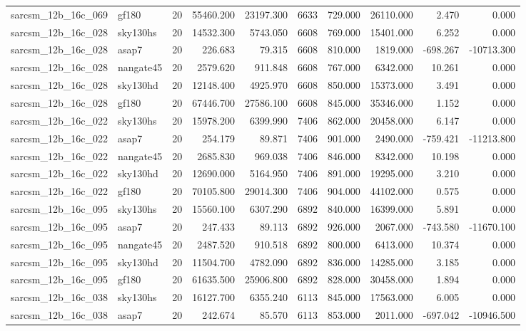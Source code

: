 \begin{tabular}{llrrrrrrrr}
sarcsm\_12b\_16c\_069 & gf180 & 20 & 55460.200 & 23197.300 & 6633 & 729.000 & 26110.000 & 2.470 & 0.000 \\
sarcsm\_12b\_16c\_028 & sky130hs & 20 & 14532.300 & 5743.050 & 6608 & 769.000 & 15401.000 & 6.252 & 0.000 \\
sarcsm\_12b\_16c\_028 & asap7 & 20 & 226.683 & 79.315 & 6608 & 810.000 & 1819.000 & -698.267 & -10713.300 \\
sarcsm\_12b\_16c\_028 & nangate45 & 20 & 2579.620 & 911.848 & 6608 & 767.000 & 6342.000 & 10.261 & 0.000 \\
sarcsm\_12b\_16c\_028 & sky130hd & 20 & 12148.400 & 4925.970 & 6608 & 850.000 & 15373.000 & 3.491 & 0.000 \\
sarcsm\_12b\_16c\_028 & gf180 & 20 & 67446.700 & 27586.100 & 6608 & 845.000 & 35346.000 & 1.152 & 0.000 \\
sarcsm\_12b\_16c\_022 & sky130hs & 20 & 15978.200 & 6399.990 & 7406 & 862.000 & 20458.000 & 6.147 & 0.000 \\
sarcsm\_12b\_16c\_022 & asap7 & 20 & 254.179 & 89.871 & 7406 & 901.000 & 2490.000 & -759.421 & -11213.800 \\
sarcsm\_12b\_16c\_022 & nangate45 & 20 & 2685.830 & 969.038 & 7406 & 846.000 & 8342.000 & 10.198 & 0.000 \\
sarcsm\_12b\_16c\_022 & sky130hd & 20 & 12690.000 & 5164.950 & 7406 & 891.000 & 19295.000 & 3.210 & 0.000 \\
sarcsm\_12b\_16c\_022 & gf180 & 20 & 70105.800 & 29014.300 & 7406 & 904.000 & 44102.000 & 0.575 & 0.000 \\
sarcsm\_12b\_16c\_095 & sky130hs & 20 & 15560.100 & 6307.290 & 6892 & 840.000 & 16399.000 & 5.891 & 0.000 \\
sarcsm\_12b\_16c\_095 & asap7 & 20 & 247.433 & 89.113 & 6892 & 926.000 & 2067.000 & -743.580 & -11670.100 \\
sarcsm\_12b\_16c\_095 & nangate45 & 20 & 2487.520 & 910.518 & 6892 & 800.000 & 6413.000 & 10.374 & 0.000 \\
sarcsm\_12b\_16c\_095 & sky130hd & 20 & 11504.700 & 4782.090 & 6892 & 836.000 & 14285.000 & 3.185 & 0.000 \\
sarcsm\_12b\_16c\_095 & gf180 & 20 & 61635.500 & 25906.800 & 6892 & 828.000 & 30458.000 & 1.894 & 0.000 \\
sarcsm\_12b\_16c\_038 & sky130hs & 20 & 16127.700 & 6355.240 & 6113 & 845.000 & 17563.000 & 6.005 & 0.000 \\
sarcsm\_12b\_16c\_038 & asap7 & 20 & 242.674 & 85.570 & 6113 & 853.000 & 2011.000 & -697.042 & -10946.500 \\

\end{tabular}
